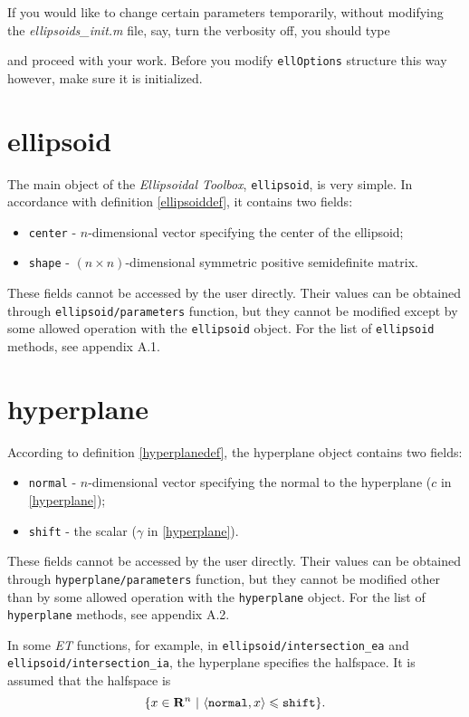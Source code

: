 If you would like to change certain parameters temporarily, without
modifying the {\it ellipsoids\_init.m} file, say, turn the verbosity off,
you should type

and proceed with your work. Before you modify {\tt ellOptions} structure
this way however, make sure it is initialized.



\section{ellipsoid}
The main object of the {\it Ellipsoidal Toolbox}, {\tt ellipsoid}, is
very simple. In accordance with definition \ref{ellipsoiddef}, it contains
two fields:
\begin{itemize}
\item {\tt center} - $n$-dimensional vector specifying the center
of the ellipsoid;
\item {\tt shape} - $(n\times n)$-dimensional symmetric positive
semidefinite matrix.
\end{itemize}
These fields cannot be accessed by the user directly. Their values
can be obtained through {\tt ellipsoid/parameters} function, but they cannot
be modified except by some allowed operation with the {\tt ellipsoid}
object. For the list of {\tt ellipsoid} methods, see appendix A.1.



\section{hyperplane}
According to  definition \ref{hyperplanedef}, the hyperplane object
contains two fields:
\begin{itemize}
\item {\tt normal} - $n$-dimensional vector specifying the normal to
the hyperplane ($c$ in \ref{hyperplane});
\item {\tt shift} - the scalar ($\gamma$ in \ref{hyperplane}).
\end{itemize}
These fields cannot be accessed by the user directly. Their values
can be obtained through {\tt hyperplane/parameters} function, but they cannot
be modified other than by some allowed operation with the {\tt hyperplane}
object. For the list of {\tt hyperplane} methods, see appendix A.2.

In some {\it ET} functions, for example, in {\tt ellipsoid/intersection\_ea}
and {\tt ellipsoid/intersection\_ia}, the hyperplane specifies the halfspace.
It is assumed that the halfspace is
\[ \{ x\in{\bf R}^n ~|~ \langle{\tt normal},x\rangle\leq{\tt shift}\}. \]



